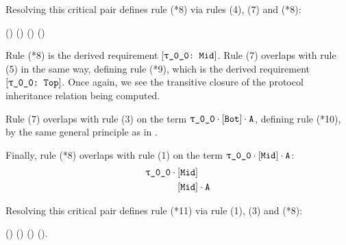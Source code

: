 \documentclass[../generics]{subfiles}
\begin{document}
\begin{example}
\pagebreak

\noindent Resolving this critical pair defines rule (*8) via rules (4), (7) and (*8):
\begin{center}
\FourLoopDerived%
{\rT\cdot{}\cdot{}}%
{\rT\cdot{}}%
{\rT}%
{\rT\cdot{}}%
{()\cdot{}}%
{()}%
{()}%
{\rT\cdot()}
\end{center}
Rule (*8) is the derived requirement $\ConfReq{\rT}{Mid}$. Rule (7) overlaps with rule (5) in the same way, defining rule (*9), which is the derived requirement $\ConfReq{\rT}{Top}$. Once again, we see the transitive closure of the protocol inheritance relation being computed.

Rule (7) overlaps with rule (3) on the term $\rT\cdot\protosym{Bot}\cdot\nA$, defining rule (*10), by the same general principle as in .

Finally, rule (*8) overlaps with rule (1) on the term $\rT\cdot\protosym{Mid}\cdot\nA$:
\begin{align*}
\rT\cdot{}&\protosym{Mid}\\
&\protosym{Mid}\cdot\nA
\end{align*}

Resolving this critical pair defines rule (*11) via rule (1), (3) and (*8):
\begin{center}
\FourLoopDerived%
{\rT\cdot{}\cdot\nA}%
{\rT\cdot{}}%
{\rT\cdot{}}%
{\rT\cdot\nA}%
{\rT\cdot()}%
{(\rT\cdot{}\Rightarrow\rT\cdot{})}%
{\rT\cdot()}%
{().\nA}
\end{center}


\end{example}
\end{document}
